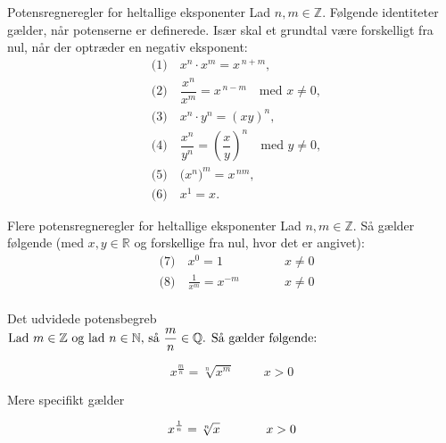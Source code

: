 \begin{proposition}{Potensregneregler for heltallige eksponenter}
Lad $n,m\in\mathbb{Z}$. Følgende identiteter gælder, når potenserne er definerede. Især skal et grundtal være forskelligt fra nul, når der optræder en negativ eksponent:
\[
\begin{aligned}
&\text{(1)}\quad x^{n}\cdot x^{m}=x^{\,n+m},\\[2pt]
&\text{(2)}\quad \dfrac{x^{n}}{x^{m}}=x^{\,n-m}\quad \text{med } x\neq 0,\\[2pt]
&\text{(3)}\quad x^{n}\cdot y^{n}=(xy)^{n},\\[2pt]
&\text{(4)}\quad \dfrac{x^{n}}{y^{n}}=\left(\dfrac{x}{y}\right)^{n}\quad \text{med } y\neq 0,\\[2pt]
&\text{(5)}\quad \bigl(x^{n}\bigr)^{m}=x^{\,nm},\\[2pt]
&\text{(6)}\quad x^{1}=x.
\end{aligned}
\]
\end{proposition}

\begin{proposition}{Flere potensregneregler for heltallige eksponenter}
Lad $n,m\in\mathbb{Z}$. Så gælder følgende (med $x,y\in\mathbb{R}$ og forskellige fra nul, hvor det er angivet):
\[
\begin{aligned}
&\text{(7)}\quad x^{0}=1   &\qquad&   x \neq 0  \\
&\text{(8)}\quad \frac{1}{x^{m}}=x^{-m} &\qquad& x \neq 0 \\
\end{aligned}
\]
\end{proposition}

\begin{definition}{Det udvidede potensbegreb}
$\textnormal{Lad } m \in \mathbb{Z} \textnormal{ og lad }  n \in \mathbb{N}\textnormal{, så } \dfrac{m}{n} \in \mathbb{Q}  \textnormal{. Så gælder følgende:}$

\[
x^{\frac{m}{n}} = \sqrt[n]{x^m} \hspace{1cm} x > 0
\]

\textnormal{Mere specifikt gælder}

\[
x^{\frac{1}{n}} = \sqrt[n]{x} \hspace{1.3cm} x > 0
\]

\end{definition}

